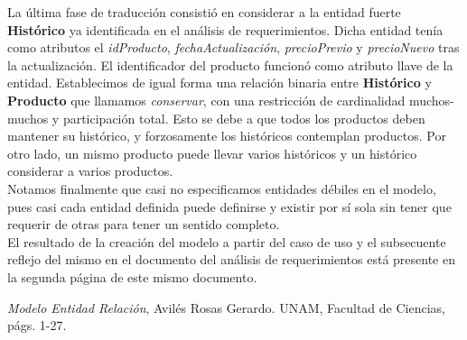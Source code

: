 \documentclass[11pt,letterpaper]{article}
\begin{document}
La última fase de traducción consistió en considerar a la entidad fuerte \textbf{Histórico} ya identificada en el análisis de requerimientos. Dicha entidad tenía como atributos el \textit{idProducto}, \textit{fechaActualización}, \textit{precioPrevio} y \textit{precioNuevo} tras la actualización. El identificador del producto funcionó como atributo llave de la entidad. Establecimos de igual forma una relación binaria entre \textbf{Histórico} y \textbf{Producto} que llamamos \textit{conservar}, con una restricción de cardinalidad muchos-muchos y participación total. Esto se debe a que todos los productos deben mantener su histórico, y forzosamente los históricos contemplan productos. Por otro lado, un mismo producto puede llevar varios históricos y un histórico considerar a varios productos.\\

Notamos finalmente que casi no especificamos entidades débiles en el modelo, pues casi cada entidad definida puede definirse y existir por sí sola sin tener que requerir
de otras para tener un sentido completo.\\

El resultado de la creación del modelo a partir del caso de uso y el subsecuente reflejo del mismo en el documento del análisis de requerimientos está presente en la segunda página de este mismo documento.
 \begin{thebibliography}{1}


     \textit{Modelo Entidad Relación}, Avilés Rosas Gerardo. UNAM, Facultad de Ciencias, págs. 1-27.


  \end{thebibliography}
\end{document}

